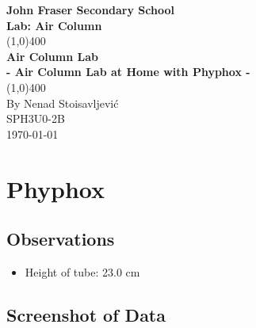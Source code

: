 \documentclass[12pt]{article}
\numberwithin{equation}{section}
\begin{document}
\begin{titlepage}
\begin{center}
\vspace*{1cm}
\Large{\textbf{John Fraser Secondary School}}\\
\Large{\textbf{Lab: Air Column}}\\
\vfill
\line(1,0){400}\\[1mm]
\huge{\textbf{Air Column Lab}}\\[3mm]
\Large{\textbf{- Air Column Lab at Home with Phyphox -}}\\[1mm]
\line(1,0){400}\\
\vfill
By Nenad Stoisavljević\\
SPH3U0-2B\\
\today\\
\end{center}
\end{titlepage}

\tableofcontents
\thispagestyle{empty}
\clearpage

\setcounter{page}{1}

\section{Phyphox}

\subsection{Observations}

\begin{itemize}
	\item Height of tube: 23.0 cm
\end{itemize}

\subsection{Screenshot of Data}
\end{document}
